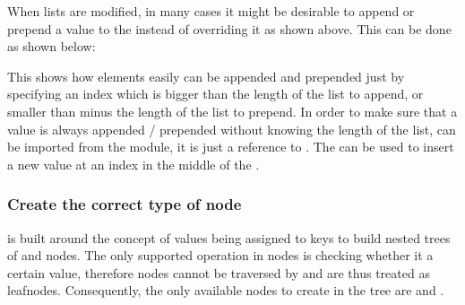 \documentclass[a4paper,10pt,english]{sphinxmanual}
\begin{document}
\sphinxAtStartPar
When lists are modified, in many cases it might be desirable to append or prepend a value to the  instead of overriding it as shown above. This can be done as shown below:

\begin{sphinxVerbatim}[commandchars=\\\{\},numbers=left,firstnumber=1,stepnumber=1]
    
   
\end{sphinxVerbatim}

\sphinxAtStartPar
This shows how elements easily can be appended and prepended just by specifying an index which is bigger than the length of the list to append, or smaller than minus the length of the list to prepend. In order to make sure that a value is always appended / prepended without knowing the length of the list,  can be imported from the \sphinxhyphen{}module, it is just a reference to . The  {\hyperref[\detokenize{README:list_insert}]{\emph{}}} can be used to insert a new value at an index in the middle of the .


\subsubsection{Create the correct type of node}
\label{\detokenize{README:create-the-correct-type-of-node}}
\sphinxAtStartPar
{} is built around the concept of values being assigned to keys to build nested trees of \sphinxhyphen{} and \sphinxhyphen{}nodes. The only supported operation in \sphinxhyphen{}nodes is checking whether it  a certain value, therefore \sphinxhyphen{}nodes cannot be traversed by {\hyperref[\detokenize{README:the-path-parameter}]{\emph{}}} and are thus treated as leaf\sphinxhyphen{}nodes. Consequently, the only available nodes to create in the tree are   and  .
\end{document}

